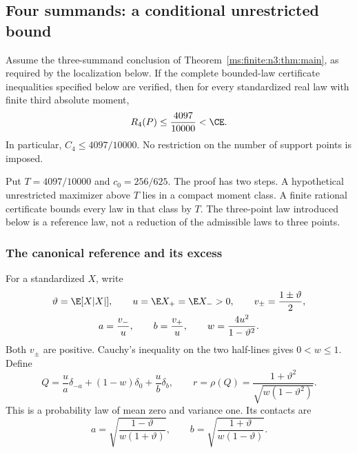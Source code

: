 \subsection{Four summands: a conditional unrestricted bound}\label{ms:finite:n4all:section}

\begin{theorem}\label{ms:finite:n4all:thm:main}
Assume the three-summand conclusion of Theorem~\ref{ms:finite:n3:thm:main}, as required by the localization below. If the complete bounded-law certificate inequalities specified below
are verified, then for every standardized real law with finite third absolute moment,
\[
 R_4(P)\le\frac{4097}{10000}<\CE.
\]
In particular, $C_4\le4097/10000$. No restriction on the number of
support points is imposed.
\end{theorem}

Put $T=4097/10000$ and $c_0=256/625$. The proof has two steps.
A hypothetical unrestricted maximizer above $T$ lies in a compact
moment class. A finite rational certificate bounds every law in that
class by $T$. The three-point law introduced below is a reference law,
not a reduction of the admissible laws to three points.

\subsubsection{The canonical reference and its excess}
For a standardized $X$, write
\[
 \begin{gathered}
 \vartheta=\E[X|X|],\qquad u=\E X_+=\E X_->0,\qquad
 v_\pm=\frac{1\pm\vartheta}{2},\\
 a=\frac{v_-}{u},\qquad b=\frac{v_+}{u},\qquad
 w=\frac{4u^2}{1-\vartheta^2}.
 \end{gathered}
\]
Both $v_\pm$ are positive. Cauchy's inequality on the two half-lines
gives $0<w\le1$. Define
\begin{equation}\label{ms:finite:n4all:eq:reference}
 Q=\frac{u}{a}\delta_{-a}+(1-w)\delta_0+\frac{u}{b}\delta_b,
 \qquad
 r=\rho(Q)=\frac{1+\vartheta^2}{\sqrt{w(1-\vartheta^2)}}.
\end{equation}
This is a probability law of mean zero and variance one. Its contacts
are
\[
 a=\sqrt{\frac{1-\vartheta}{w(1+\vartheta)}},\qquad
 b=\sqrt{\frac{1+\vartheta}{w(1-\vartheta)}}.
\]

